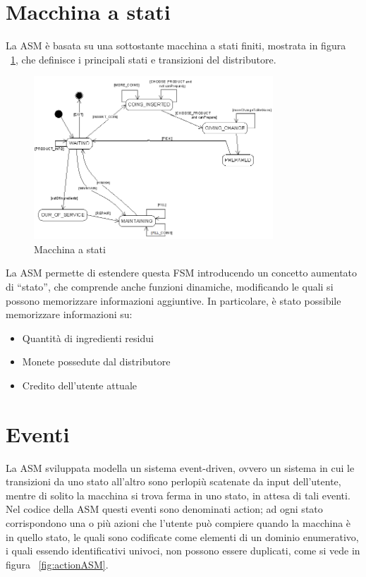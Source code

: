 \section{Macchina a stati}
La ASM è basata su una sottostante macchina a stati finiti, mostrata in figura ~\ref{fig:StateMachine}, che definisce i principali stati e transizioni del distributore. 
\begin{figure}[h]
	\centering
	\includegraphics[width=0.8\textwidth]{Immagini/FSM.png}
	\caption{Macchina a stati}
	\label{fig:StateMachine}
\end{figure}
La ASM permette di estendere questa FSM introducendo un concetto aumentato di “stato”, che comprende anche funzioni dinamiche, modificando le quali si possono memorizzare informazioni aggiuntive.
In particolare, è stato possibile memorizzare informazioni su:
\begin{itemize}
	\item Quantità di ingredienti residui
	\item Monete possedute dal distributore
	\item Credito dell'utente attuale
\end{itemize}

\section{Eventi}
La ASM sviluppata modella un sistema event-driven, ovvero un sistema in cui le transizioni da uno stato all’altro sono perlopiù scatenate da input dell’utente, mentre di solito la macchina si trova ferma in uno stato, in attesa di tali eventi.
Nel codice della ASM questi eventi sono denominati action; ad ogni stato corrispondono una o più azioni che l’utente può compiere quando la macchina è in quello stato, le quali sono codificate come elementi di un dominio enumerativo, i quali essendo identificativi univoci, non possono essere duplicati, come si vede in figura ~\ref{fig:actionASM}.

